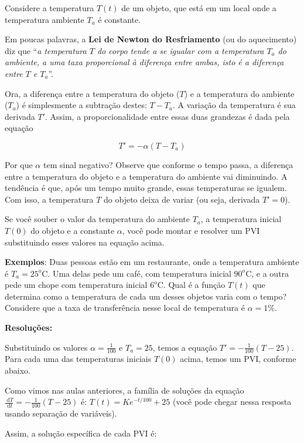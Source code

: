\documentclass[a4paper]{article}
\newcommand{\ud}{\mathrm{\ d}}
\begin{document}
Considere a temperatura $T(t)$ de um objeto, que está em um local onde
a temperatura ambiente $T_a$ é constante.

Em poucas palavras, a {\bf Lei de Newton do Resfriamento} (ou do
aquecimento) diz que ``{\em a temperatura $T$ do corpo tende a se
  igualar com a temperatura $T_a$ do ambiente, a uma taxa proporcional
  à diferença entre ambas, isto é a diferença entre $T$ e $T_a$}''.

Ora, a diferença entre a temperatura do objeto ($T$) e a temperatura
do ambiente ($T_a$) é simplesmente a subtração destes: $T - T_a$. A
variação da temperatura é sua derivada $T'$. Assim, a
proporcionalidade entre essas duas grandezas é dada pela equação

\begin{displaymath}
  T' = -\alpha(T-T_a)
\end{displaymath}

Por que $\alpha$ tem sinal negativo? Observe que conforme o tempo passa, a
diferença entre a temperatura do objeto e a temperatura do ambiente
vai diminuindo. A tendência é que, após um tempo muito grande, essas
temperaturas se igualem. Com isso, a temperatura $T$ do objeto deixa
de variar (ou seja, derivada $T'=0$).

Se você souber o valor da temperatura do ambiente $T_a$, a temperatura
inicial $T(0)$ do objeto e a constante $\alpha$, você pode montar e
resolver um PVI substituindo esses valores na equação acima.

{\bf Exemplos}: Duas pessoas estão em um restaurante, onde a
temperatura ambiente é $T_a=25^o$C. Uma delas pede um café, com
temperatura inicial $90^o$C, e a outra pede um chope com temperatura
inicial $6^o$C. Qual é a função $T(t)$ que determina como a
temperatura de cada um desses objetos varia com o tempo? Considere que
a taxa de transferência nesse local de temperatura é $\alpha=1\%$.

{\bf Resoluções:}

Substituindo os valores $\alpha=\frac{1}{100}$ e $T_a=25$, temos a
equação $T'=-\frac{1}{100}(T-25)$. Para cada uma das temperaturas
iniciais $T(0)$ acima, temos um PVI, conforme abaixo.

Como vimos nas aulas anteriores, a família de soluções da equação
$\frac{\ud T}{\ud t}=-\frac{1}{100}(T-25)$ é: $T(t)=Ke^{-t/100}+25$
(você pode chegar nessa resposta usando separação de variáveis).

Assim, a solução específica de cada PVI é:
\end{document}
